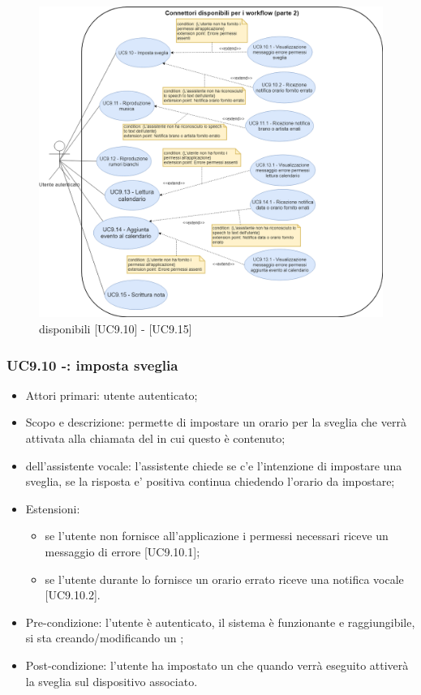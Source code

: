 \begin{figure}[H]
	\centering
	\includegraphics[width=15cm,keepaspectratio]{../includes/pics/wf2.png}
	\caption{\label{fig:mission} disponibili [UC9.10] - [UC9.15]}
\end{figure}
\clearpage
\subsubsection{UC9.10 -: imposta sveglia}
\begin{itemize}
	\item  Attori primari: utente autenticato;
	\item  Scopo e descrizione: permette di impostare un orario per la sveglia che verrà attivata alla chiamata del  in cui questo  è contenuto;
	\item  {} dell'assistente vocale: l'assistente chiede se c'e l'intenzione di impostare una sveglia, se la risposta e' positiva continua chiedendo l'orario da impostare;
	\item  Estensioni: 
		   \begin{itemize}
				\item se l'utente non fornisce all'applicazione i permessi necessari riceve un messaggio di errore [UC9.10.1];
				\item se l'utente durante lo  fornisce un orario errato riceve una notifica vocale [UC9.10.2].
		   \end{itemize}
	\item  Pre-condizione: l'utente è autenticato, il sistema è funzionante e raggiungibile, si sta creando/modificando un ;
	\item  Post-condizione: l'utente ha impostato un  che quando verrà eseguito attiverà la sveglia sul dispositivo associato.
\end{itemize}
